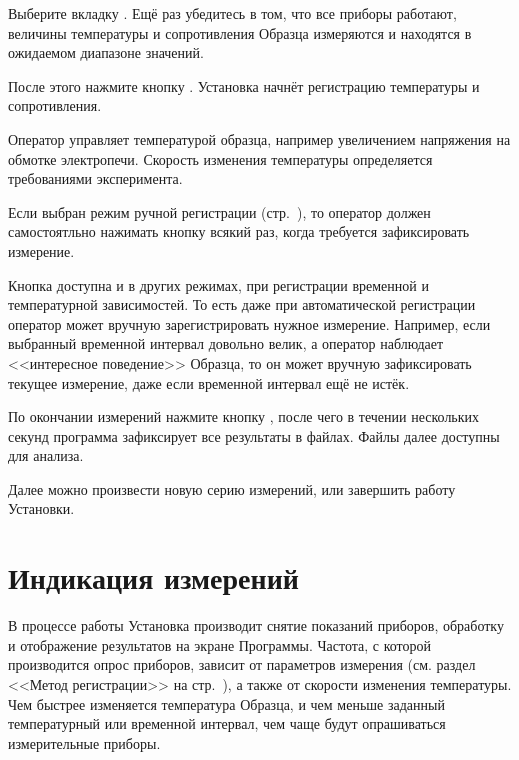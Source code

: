 \documentclass[12pt, a4paper, twocolumn]{report}
\begin{document}
Выберите вкладку . Ещё раз убедитесь в том, что все приборы работают, величины температуры и сопротивления Образца измеряются и находятся в ожидаемом диапазоне значений.

После этого нажмите кнопку . Установка начнёт регистрацию температуры и сопротивления.

Оператор управляет температурой образца, например увеличением напряжения на обмотке электропечи. Скорость изменения температуры определяется требованиями эксперимента.

Если выбран режим ручной регистрации (стр.~\pageref{sec_reg_type_manual}), то оператор должен самостоятльно нажимать кнопку \label{sec_manual} всякий раз, когда требуется зафиксировать измерение.

Кнопка  доступна и в других режимах, при регистрации временной и температурной зависимостей. То есть даже при автоматической регистрации оператор может вручную зарегистрировать нужное измерение. Например, если выбранный временной интервал довольно велик, а оператор наблюдает <<интересное поведение>> Образца, то он может вручную зафиксировать текущее измерение, даже если временной интервал ещё не истёк.


По окончании измерений нажмите кнопку , после чего в течении нескольких секунд программа зафиксирует все результаты в файлах. Файлы далее доступны для анализа.

Далее можно произвести новую серию измерений, или завершить работу Установки.

\section{Индикация измерений}

В процессе работы Установка производит снятие показаний приборов, обработку и отображение результатов на экране Программы. Частота, с которой производится опрос приборов, зависит от параметров измерения (см. раздел <<Метод регистрации>> на стр.~\pageref{sec_reg_method}), а также от скорости изменения температуры. Чем быстрее изменяется температура Образца, и чем меньше заданный температурный или временной интервал, чем чаще будут опрашиваться измерительные приборы.
\end{document}
